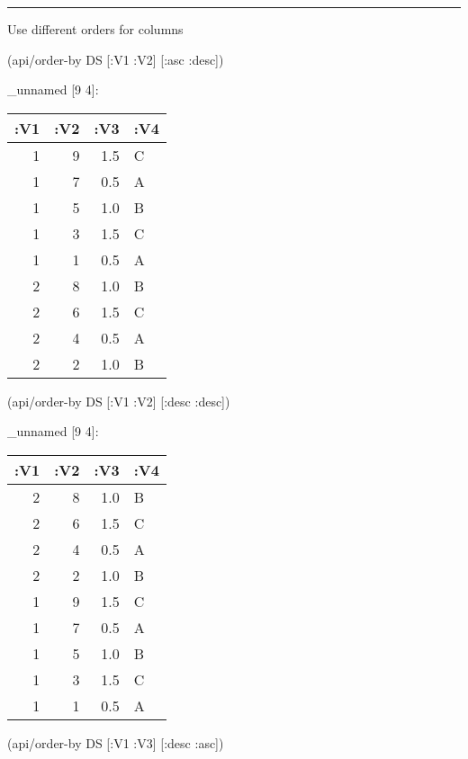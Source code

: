 \documentclass[]{article}
\newenvironment{Shaded}{\begin{snugshade}}{\end{snugshade}}
\newcommand{\AttributeTok}[1]{\textcolor[rgb]{0.77,0.63,0.00}{#1}}
\newcommand{\NormalTok}[1]{#1}
\begin{document}
\begin{center}\rule{0.5\linewidth}{0.5pt}\end{center}

Use different orders for columns

\begin{Shaded}
\begin{Highlighting}[]
\NormalTok{(api/order-by DS [}\AttributeTok{:V1} \AttributeTok{:V2}\NormalTok{] [}\AttributeTok{:asc} \AttributeTok{:desc}\NormalTok{])}
\end{Highlighting}
\end{Shaded}

\_unnamed {[}9 4{]}:

\begin{longtable}[]{@{}rrrl@{}}
\toprule
:V1 & :V2 & :V3 & :V4\tabularnewline
\midrule
\endhead
1 & 9 & 1.5 & C\tabularnewline
1 & 7 & 0.5 & A\tabularnewline
1 & 5 & 1.0 & B\tabularnewline
1 & 3 & 1.5 & C\tabularnewline
1 & 1 & 0.5 & A\tabularnewline
2 & 8 & 1.0 & B\tabularnewline
2 & 6 & 1.5 & C\tabularnewline
2 & 4 & 0.5 & A\tabularnewline
2 & 2 & 1.0 & B\tabularnewline
\bottomrule
\end{longtable}

\begin{Shaded}
\begin{Highlighting}[]
\NormalTok{(api/order-by DS [}\AttributeTok{:V1} \AttributeTok{:V2}\NormalTok{] [}\AttributeTok{:desc} \AttributeTok{:desc}\NormalTok{])}
\end{Highlighting}
\end{Shaded}

\_unnamed {[}9 4{]}:

\begin{longtable}[]{@{}rrrl@{}}
\toprule
:V1 & :V2 & :V3 & :V4\tabularnewline
\midrule
\endhead
2 & 8 & 1.0 & B\tabularnewline
2 & 6 & 1.5 & C\tabularnewline
2 & 4 & 0.5 & A\tabularnewline
2 & 2 & 1.0 & B\tabularnewline
1 & 9 & 1.5 & C\tabularnewline
1 & 7 & 0.5 & A\tabularnewline
1 & 5 & 1.0 & B\tabularnewline
1 & 3 & 1.5 & C\tabularnewline
1 & 1 & 0.5 & A\tabularnewline
\bottomrule
\end{longtable}

\begin{Shaded}
\begin{Highlighting}[]
\NormalTok{(api/order-by DS [}\AttributeTok{:V1} \AttributeTok{:V3}\NormalTok{] [}\AttributeTok{:desc} \AttributeTok{:asc}\NormalTok{])}
\end{Highlighting}
\end{Shaded}
\end{document}
